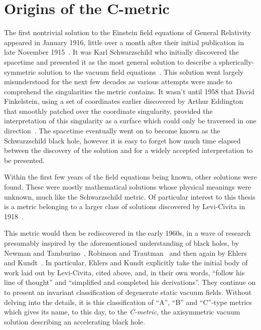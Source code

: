 \documentclass[
twoside,
openright,
frontopenright,
]{dmathesis}
\begin{document}
\section{Origins of the C-metric}
\label{sec:cmet-history}

The first nontrivial solution to the Einstein field equations of General
Relativity appeared in January 1916, little over a month after their initial
publication in late November 1915~\cite{Einstein:1915aa,Einstein:1916aa}. It was
Karl Schwarzschild who initially discovered the spacetime and presented it as
the most general solution to describe a spherically-symmetric solution to the
vacuum field equations~\cite{Schwarzschild:1916ab, Schwarzschild:1916aa,
  Schwarzschild:1916ea}. This solution went largely misunderstood for the next
few decades as various attempts were made to comprehend the singularities the
metric contains. It wasn't until 1958 that David Finkelstein, using a set of
coordinates earlier discovered by Arthur Eddington that smoothly patched over
the coordinate singularity, provided the interpretation of this singularity as a
surface which could only be traversed in one
direction~\cite{Finkelstein:1958aa}. The spacetime eventually went on to become
known as the Schwarzschild black hole, however it is easy to forget how much
time elapsed between the discovery of the solution and for a widely accepted
interpretation to be presented.

Within the first few years of the field equations being known, other solutions
were found. These were mostly mathematical solutions whose physical meanings
were unknown, much like the Schwarzschild metric. Of particular interest to this
thesis is a metric belonging to a larger class of solutions discovered by
Levi-Civita in 1918~\cite{Levi-Civita:1918aa}.

This metric would then be rediscovered in the early 1960s, in a wave of research
presumably inspired by the aforementioned understanding of black holes, by
Newman and Tamburino~\cite{Newman:1961aa}, Robinson and
Trautman~\cite{Robinson:1962zz} and then again by Ehlers and
Kundt~\cite{Ehlers:1962aa}. In particular, Ehlers and Kundt explicitly take the
initial body of work laid out by Levi-Civita, cited above, and, in their own
words, ``follow his line of thought'' and ``simplified and completed his
derivations''. They continue on to present an invariant classification of
degenerate static vacuum fields. Without delving into the details, it is this
classification of ``A'', ``B'' and ``C''-type metrics which gives its name, to
this day, to the \emph{C-metric}, the axisymmetric vacuum solution describing an
accelerating black hole.
\end{document}
